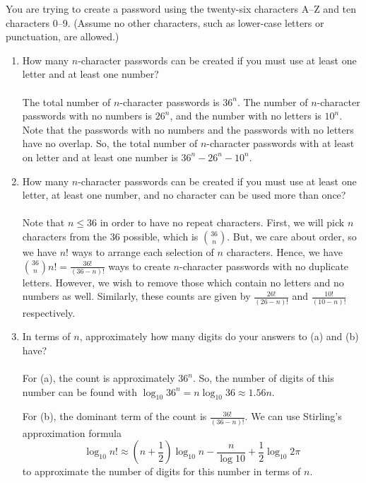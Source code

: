 \documentclass{subfiles}
\begin{document}
You are trying to create a password using the twenty-six characters A--Z and ten characters 0--9. (Assume no other characters, such as lower-case letters or punctuation, are allowed.)
\begin{enumerate}
	\item How many $n$-character passwords can be created if you must use at least one letter and at least one number?
	      \\\\
	      The total number of $n$-character passwords is $36^n$.
	      The number of  $n$-character passwords with no numbers is  $26^n$, and the number with no letters is $10^n$.
	      Note that the passwords with no numbers and the passwords with no letters have no overlap.
	      So, the total number of $n$-character passwords with at least on letter and at least one number is  $36^n-26^n-10^n$.
	      \\
	\item How many $n$-character passwords can be created if you must use at least one letter, at least one number, and no character can be used more than once?
	      \\\\
	      Note that $n\le 36$ in order to have no repeat characters.
	      First, we will pick $n$ characters from the 36 possible, which is $\binom{36}{n}$.
	      But, we care about order, so we have $n!$ ways to arrange each selection of  $n$ characters.
	      Hence, we have  $\binom{36}{n}n! = \frac{36!}{(36-n)!}$ ways to create $n$-character passwords with no duplicate letters.
	      However, we wish to remove those which contain no letters and no numbers as well. Similarly, these counts are given by $\frac{26!}{(26-n)!}$ and $\frac{10!}{(10-n)!}$ respectively.
	      \\
	\item In terms of $n$, approximately how many digits do your answers to (a) and (b) have?
	      \\\\
	      For (a), the count is approximately $36^n$.
	      So, the number of digits of this number can be found with $\log_{10}{36^n} = n\log_{10}{36} \approx 1.56n$.

	      For (b), the dominant term of the count is $\frac{36!}{(36-n)!}$.
	      We can use Stirling's approximation formula \[
		      \log_{10}{n!}\approx \left( n+\frac{1}{2} \right) \log_{10}{n} -\frac{n}{\log{10} }+\frac{1}{2}\log_{10}{2\pi}
	      \] to approximate the number of digits for this number in terms of $n$.


\end{enumerate}
\end{document}
